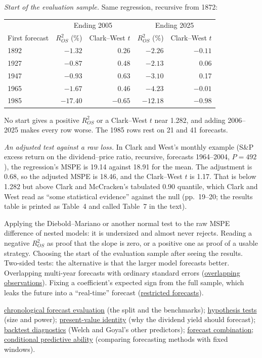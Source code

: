 \begin{qfmethod}
\emph{Start of the evaluation sample.} Same regression, recursive from 1872:
\begin{center}\small
\begin{tabular}{@{}lrrrr@{}}
\toprule
& \multicolumn{2}{c}{Ending 2005} & \multicolumn{2}{c}{Ending 2025} \\
First forecast & $R^2_{OS}$ (\%) & Clark--West $t$ & $R^2_{OS}$ (\%) & Clark--West $t$ \\
\midrule
1892 & $-1.32$ & 0.26 & $-2.26$ & $-0.11$ \\
1927 & $-0.87$ & 0.48 & $-2.13$ & 0.06 \\
1947 & $-0.93$ & 0.63 & $-3.10$ & 0.17 \\
1965 & $-1.67$ & 0.46 & $-4.23$ & $-0.01$ \\
1985 & $-17.40$ & $-0.65$ & $-12.18$ & $-0.98$ \\
\bottomrule
\end{tabular}
\end{center}
No start gives a positive $R^2_{OS}$ or a Clark--West $t$ near 1.282, and adding 2006--2025 makes every row worse. The 1985 rows rest on 21 and 41 forecasts.

\emph{An adjusted test against a raw loss.} In Clark and West's monthly example (S\&P excess return on the dividend--price ratio, recursive, forecasts 1964--2004, $P=492$), the regression's MSPE is 19.14 against 18.91 for the mean. The adjustment is 0.68, so the adjusted MSPE is 18.46, and the Clark--West $t$ is 1.17. That is below 1.282 but above Clark and McCracken's tabulated 0.90 quantile, which Clark and West read as ``some statistical evidence'' against the null (pp.~19--20; the results table is printed as Table~4 and called Table~7 in the text).

 Applying the Diebold--Mariano or another normal test to the raw MSPE difference of nested models: it is undersized and almost never rejects. Reading a negative $R^2_{OS}$ as proof that the slope is zero, or a positive one as proof of a usable strategy. Choosing the start of the evaluation sample after seeing the results. Two-sided tests: the alternative is that the larger model forecasts better. Overlapping multi-year forecasts with ordinary standard errors (\hyperref[meth:correlation-independence-tests]{overlapping observations}). Fixing a coefficient's expected sign from the full sample, which leaks the future into a ``real-time'' forecast (\hyperref[meth:restricted-forecast-value]{restricted forecasts}).

 \hyperref[meth:forecast-accuracy-evaluation]{chronological forecast evaluation} (the split and the benchmarks); \hyperref[meth:hypothesis-testing]{hypothesis tests} (size and power); \hyperref[res:campbell-shiller-identity]{present-value identity} (why the dividend yield should forecast); \hyperref[meth:backtest-evaluation-diagnostics]{backtest diagnostics} (Welch and Goyal's other predictors); \hyperref[meth:forecast-combination]{forecast combination}; \hyperref[meth:conditional-predictive-ability]{conditional predictive ability} (comparing forecasting methods with fixed windows).

\end{qfmethod}


